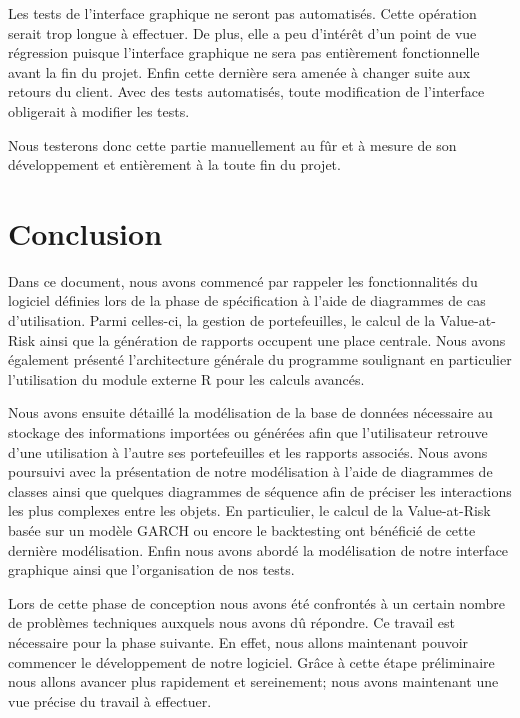 \documentclass[a4paper,titlepage,french]{report}
\begin{document}
Les tests de l'interface graphique ne seront pas automatisés.
Cette opération serait trop longue à effectuer.
De plus, elle a peu d'intérêt d'un point de vue régression puisque l'interface graphique ne sera pas entièrement fonctionnelle avant la fin du projet.
Enfin cette dernière sera amenée à changer suite aux retours du client.
Avec des tests automatisés, toute modification de l'interface obligerait à modifier les tests.

Nous testerons donc cette partie manuellement au fûr et à mesure de son développement et entièrement à la toute fin du projet.


\chapter*{Conclusion}

Dans ce document, nous avons commencé par rappeler les fonctionnalités du logiciel définies lors de la phase de spécification à l'aide de diagrammes de cas d'utilisation.
Parmi celles-ci, la gestion de portefeuilles, le calcul de la Value-at-Risk ainsi que la génération de rapports occupent une place centrale.
Nous avons également présenté l'architecture générale du programme soulignant en particulier l'utilisation du module externe R pour les calculs avancés.

Nous avons ensuite détaillé la modélisation de la base de données nécessaire au stockage des informations importées ou générées afin que l'utilisateur retrouve d'une utilisation à l'autre ses portefeuilles et les rapports associés.
Nous avons poursuivi avec la présentation de notre modélisation à l'aide de diagrammes de classes ainsi que quelques diagrammes de séquence afin de préciser les interactions les plus complexes entre les objets.
En particulier, le calcul de la Value-at-Risk basée sur un modèle GARCH ou encore le backtesting ont bénéficié de cette dernière modélisation.
Enfin nous avons abordé la modélisation de notre interface graphique ainsi que l'organisation de nos tests.

Lors de cette phase de conception nous avons été confrontés à un certain nombre de problèmes techniques auxquels nous avons dû répondre.
Ce travail est nécessaire pour la phase suivante.
En effet, nous allons maintenant pouvoir commencer le développement de notre logiciel.
Grâce à cette étape préliminaire nous allons avancer plus rapidement et sereinement; nous avons maintenant une vue précise du travail à effectuer.




\end{document}
